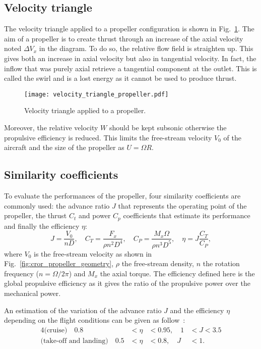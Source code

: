 \subsection{Velocity triangle}
\label{sub:cror_propeller_velocity_triangle}
The velocity triangle applied to a propeller configuration
is shown in Fig.~\ref{fig:cror_velocity_triangle_propeller}.
The aim of a propeller is to create thrust through an increase
of the axial velocity noted $\Delta V_x$ in the diagram. To do
so, the relative flow field is straighten up. This gives both
an increase in axial velocity but also in tangential velocity.
In fact, the inflow that was purely axial retrieve a tangential
component at the outlet. This is called the swirl and
is a lost energy as it cannot be used to produce thrust.
\begin{figure}[htp]
  \centering
  \texttt{[image: velocity\_triangle\_propeller.pdf]}
  \caption{Velocity triangle applied to a propeller.}
  \label{fig:cror_velocity_triangle_propeller}
\end{figure}
Moreover, the relative velocity $W$ should be kept subsonic
otherwise the propulsive efficiency is reduced. This limits
the free-stream velocity $V_0$ of the aircraft and the size of 
the propeller as $U = \Omega R$.

\subsection{Similarity coefficients}
\label{sub:similarity_coefficients}
To evaluate the performances of the propeller, four similarity
coefficients are commonly used:
the advance ratio $J$ that represents the operating point of the propeller,
the thrust $C_t$ and power $C_p$ coefficients that estimate its performance and finally
the efficiency $\eta$:
\begin{equation}
    J = \frac{V_0}{n D}, \quad
    C_T = \frac{F_x}{\rho n ^ 2  D ^ 4}, \quad
    C_P = \frac{M_x \Omega}{\rho n ^ 3 D ^ 5}, \quad
    \eta = J \frac{C_T}{C_P},
\end{equation}
where $V_0$ is the free-stream velocity 
as shown in Fig.~\ref{fig:cror_propeller_geometry},
$\rho$ the free-stream density,
$n$ the rotation frequency ($n = \Omega / 2 \pi$) and
$M_x$ the axial torque.
The efficiency defined here is the global propulsive efficiency
as it gives the ratio of the propulsive power over the mechanical power.

An estimation of the variation of the advance ratio $J$ and the 
efficiency $\eta$ depending on the flight conditions can be given as follow~\cite{Bousquet2012}:
\begin{alignat}{4}
    \text{(cruise)} \quad  0.8 &< \eta &< 0.95, \quad 1 &< J < 3.5 \\
    \text{(take-off and landing)} \quad  0.5 &< \eta &< 0.8, \quad J &< 1.
    \label{eq:estimation_sim_coeff}
\end{alignat}

